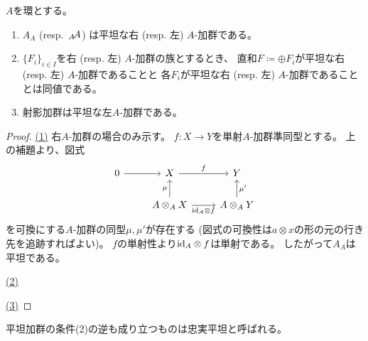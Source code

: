 \documentclass[report]{jlreq}
\begin{document}
\begin{theorem}[基本的な平坦加群]
    $A$を環とする。
    \begin{enumerate}
        \item $A_A$ (resp. $\,{}_{A}\!A$) は平坦な右 (resp. 左) $A$-加群である。
        \item $\{ F_i \}_{i \in I}$を右 (resp. 左) $A$-加群の族とするとき、
            直和$F \coloneqq \oplus F_i$が平坦な右 (resp. 左) $A$-加群であることと
            各$F_i$が平坦な右 (resp. 左) $A$-加群であることとは同値である。
        \item 射影加群は平坦な左$A$-加群である。
    \end{enumerate}
\end{theorem}

\begin{proof}
    \uline{(1)} \quad
    右$A$-加群の場合のみ示す。
    $f \colon X \to Y$を単射$A$-加群準同型とする。
    上の補題より、図式
    \begin{equation}
        \begin{tikzcd}
            0
                \ar{r}
                & X
                    \ar{r}{f}
                & Y \\
            & A \otimes_A X
                \ar{u}{\mu}
                \ar{r}[swap]{\id_A \otimes f}
                & A \otimes_A Y
                    \ar{u}[swap]{\mu'}
        \end{tikzcd}
    \end{equation}
    を可換にする$A$-加群の同型$\mu, \mu'$が存在する
    (図式の可換性は$a \otimes x$の形の元の行き先を追跡すればよい)。
    $f$の単射性より$\mathrm{id}_A \otimes f$は単射である。
    したがって$A_A$は平坦である。

    \uline{(2)} \quad
    \TODO{}

    \uline{(3)} \quad
\end{proof}

平坦加群の条件(2)の逆も成り立つものは忠実平坦と呼ばれる。
\end{document}
